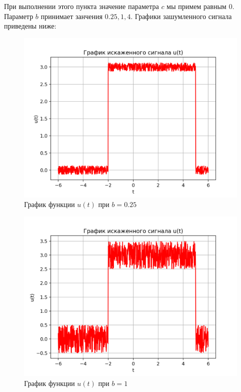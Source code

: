 При выполнении этого пункта значение параметра $c$ мы примем равным $0$. Параметр $b$ принимает занчения $0.25, 1, 4$. Графики зашумленного сигнала приведены ниже:

\begin{figure}[ht!]
    \centering
    \includegraphics[scale=0.75]{media/1 task/high_freq/Noisy_0,25.png}
    \caption{График функции $u(t)$ при $b=0.25$}
    \label{fig:noisy_025}
\end{figure}

\clearpage

\begin{figure}[ht!]
    \centering
    \includegraphics[scale=0.75]{media/1 task/high_freq/Noisy_1.png}
    \caption{График функции $u(t)$ при $b=1$}
    \label{fig:noisy_1}
\end{figure}

